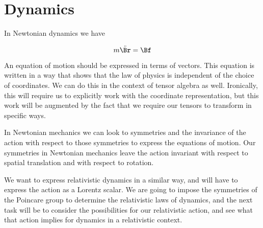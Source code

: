%
%
\section{Dynamics}

In Newtonian dynamics we have 

\begin{equation}\label{eqn:relativisticElectrodynamicsL6:250}
m \ddot{\Br} = \Bf
\end{equation}

An equation of motion should be expressed in terms of vectors.  This equation is written in a way that shows that the law of physics is independent of the choice of coordinates.  We can do this in the context of tensor algebra as well.  Ironically, this will require us to explicitly work with the coordinate representation, but this work will be augmented by the fact that we require our tensors to transform in specific ways.

In Newtonian mechanics we can look to symmetries and the invariance of the action with respect to those symmetries to express the equations of motion.  Our symmetries in Newtonian mechanics leave the action invariant with respect to spatial translation and with respect to rotation.

We want to express relativistic dynamics in a similar way, and will have to express the action as a Lorentz scalar.  We are going to impose the symmetries of the Poincare group to determine the relativistic laws of dynamics, and the next task will be to consider the possibilities for our relativistic action, and see what that action implies for dynamics in a relativistic context.
